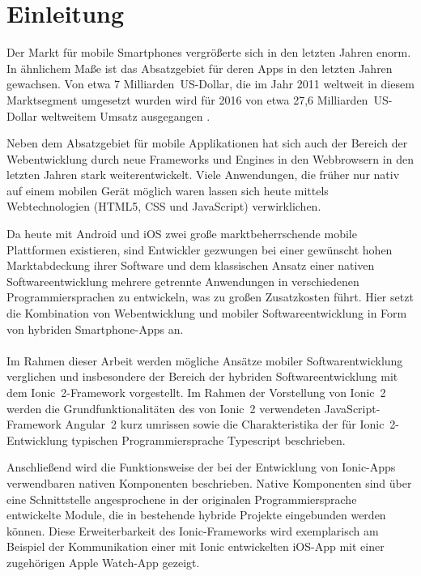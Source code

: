 \chapter{Einleitung}
%
Der Markt für mobile Smartphones vergrößerte sich in den letzten Jahren enorm\cite{ChaffeyMarketStatisticsUsageAndAdoption}. In ähnlichem Maße ist das Absatzgebiet für deren Apps in den letzten Jahren gewachsen. Von etwa 7 Milliarden~US-Dollar, die im Jahr 2011 weltweit in diesem Marktsegment umgesetzt wurden wird für 2016 von etwa 27,6 Milliarden~US-Dollar weltweitem Umsatz ausgegangen \cite{StatistaGlobalRvenues}.

Neben dem Absatzgebiet für mobile Applikationen hat sich auch der Bereich der Webentwicklung durch neue Frameworks und Engines in den Webbrowsern in den letzten Jahren stark weiterentwickelt. Viele Anwendungen, die früher nur nativ auf einem mobilen Gerät möglich waren lassen sich heute mittels Webtechnologien (HTML5, CSS und JavaScript) verwirklichen.

Da heute mit Android und iOS zwei große marktbeherrschende mobile Plattformen existieren, sind Entwickler gezwungen bei einer gewünscht hohen Marktabdeckung ihrer Software und dem klassischen Ansatz einer nativen Softwareentwicklung mehrere getrennte Anwendungen in verschiedenen Programmiersprachen zu entwickeln, was zu großen Zusatzkosten führt. Hier setzt die Kombination von Webentwicklung und mobiler Softwareentwicklung in Form von hybriden Smartphone-Apps an.
\\
\\
Im Rahmen dieser Arbeit werden mögliche Ansätze mobiler Softwarentwicklung verglichen und insbesondere der Bereich der hybriden Softwareentwicklung mit dem Ionic~2-Framework vorgestellt.
Im Rahmen der Vorstellung von Ionic~2 werden die Grundfunktionalitäten des von Ionic~2 verwendeten JavaScript-Framework Angular~2 kurz umrissen sowie die Charakteristika der für Ionic~2-Entwicklung typischen Programmiersprache Typescript beschrieben.

Anschließend wird die Funktionsweise der bei der Entwicklung von Ionic-Apps verwendbaren nativen Komponenten beschrieben. Native Komponenten sind über eine Schnittstelle angesprochene in der originalen Programmiersprache entwickelte Module, die in bestehende hybride Projekte eingebunden werden können. Diese Erweiterbarkeit des Ionic-Frameworks wird exemplarisch am Beispiel der Kommunikation einer mit Ionic entwickelten iOS-App mit einer zugehörigen Apple Watch-App gezeigt.
